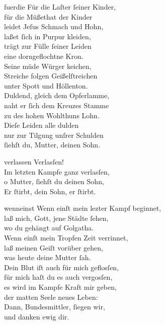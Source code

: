 \documentclass[tocstyle=ref-genre]{ees}
\begin{document}
{\clearpage
\begin{movement}{fuerdie}
  \voice[Basso]
  Für die Laſter ſeiner Kinder,\\
  für die Müßethat der Kinder\\
  leidet Jeſus Schmach und Hohn,\\
  laßet ſich in Purpur kleiden,\\
  trägt zur Fülle ſeiner Leiden\\
  eine dorngeflochtne Kron.\\
  Seine müde Würger keichen,\\
  Streiche folgen Geißelſtreichen\\
  unter Spott und Höllenton.\\
  Duldend, gleich dem Opferlamme,\\
  naht er ſich dem Kreuzes Stamme\\
  zu des hohen Wohlthuns Lohn.\\
  Dieſe Leiden alle dulden\\
  nur zur Tilgung unſrer Schulden\\
  ſiehſt du, Mutter, deinen Sohn.
\end{movement}

\begin{movement}{verlassen}
  \voice[Tenore]
  Verlasſen!\\
  Im letzten Kampfe ganz verlasſen,\\
  o Mutter, ſiehſt du deinen Sohn,\\
  Er ſtirbt, dein Sohn, er ſtirbt.
\end{movement}

\begin{movement}{wenneinst}
  Wenn einſt mein lezter Kampf beginnet,\\
  laß mich, Gott, jene Städte ſehen,\\
  wo du gehängt auf Golgatha.\\
  Wenn einſt mein Tropfen Zeit verrinnet,\\
  laß meinen Geiſt vorüber gehen,\\
  was heute deine Mutter ſah.\\
  Dein Blut iſt auch für mich geflosſen,\\
  für mich haſt du es auch vergosſen,\\
  es wird im Kampfe Kraft mir geben,\\
  der matten Seele neues Leben:\\
  Dann, Bundesmittler, ſiegen wir,\\
  und danken ewig dir.
\end{movement}

}
\end{document}
